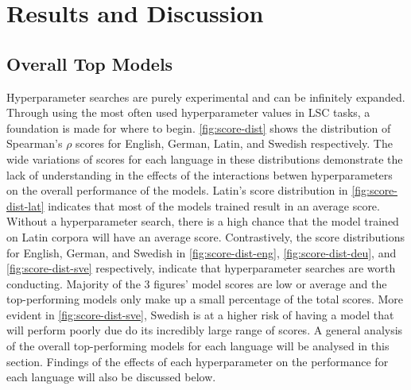 \section{Results and Discussion}
\label{sec:results}

\subsection{Overall Top Models}

Hyperparameter searches are purely experimental and can be infinitely expanded. Through using the most often used hyperparameter values in LSC tasks, a foundation is made for where to begin. \autoref{fig:score-dist} shows the distribution of Spearman's $\rho$ scores for English, German, Latin, and Swedish respectively. The wide variations of scores for each language in these distributions demonstrate the lack of understanding in the effects of the interactions betwen hyperparameters on the overall performance of the models. Latin's score distribution in \autoref{fig:score-dist-lat} indicates that most of the models trained result in an average score. Without a hyperparameter search, there is a high chance that the model trained on Latin corpora will have an average score. Contrastively, the score distributions for English, German, and Swedish in  \autoref{fig:score-dist-eng}, \autoref{fig:score-dist-deu}, and \autoref{fig:score-dist-sve} respectively, indicate that hyperparameter searches are worth conducting. Majority of the 3 figures' model scores are low or average and the top-performing models only make up a small percentage of the total scores. More evident in \autoref{fig:score-dist-sve}, Swedish is at a higher risk of having a model that will perform poorly due do its incredibly large range of scores. A general analysis of the overall top-performing models for each language will be analysed in this section. Findings of the effects of each hyperparameter on the performance for each language will also be discussed below. 

